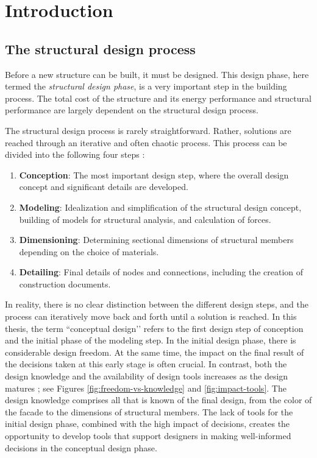 \chapter{Introduction}
\label{ch:Introduction}
\section{The structural design process}
Before a new structure can be built, it must be designed. This design phase, here termed the \textit{structural design phase}, is a very important step in the building process. The total cost of the structure and its energy performance and structural performance are largely dependent on the structural design process. 

The structural design process is rarely straightforward. Rather, solutions are reached through an iterative and often chaotic process. This process can be divided into the following four steps \cite{schlaich2006challenges}:

\begin{enumerate}  
\item \textbf{Conception}: The most important design step, where the overall design concept and significant details are developed.
\item \textbf{Modeling}: Idealization and simplification of the structural design concept, building of models for structural analysis, and calculation of forces.
\item \textbf{Dimensioning}: Determining sectional dimensions of structural members depending on the choice of materials.
\item \textbf{Detailing}: Final details of nodes and connections, including the creation of construction documents.
\end{enumerate}

In reality, there is no clear distinction between the different design steps, and the process can iteratively move back and forth until a solution is reached. In this thesis, the term ``conceptual design’’ refers to the first design step of conception and the initial phase of the modeling step. In the initial design phase, there is considerable design freedom. At the same time, the impact on the final result of the decisions taken at this early stage is often crucial. In contrast, both the design knowledge and the availability of design tools increases as the design matures \cite{schlaich2006challenges} \cite{Hsu2000}; see Figures \ref{fig:freedom-vs-knowledge} and \ref{fig:impact-tools}. The design knowledge comprises all that is known of the final design, from the color of the facade to the dimensions of structural members. The lack of tools for the initial design phase, combined with the high impact of decisions, creates the opportunity to develop tools that support designers in making well-informed decisions in the conceptual design phase.


